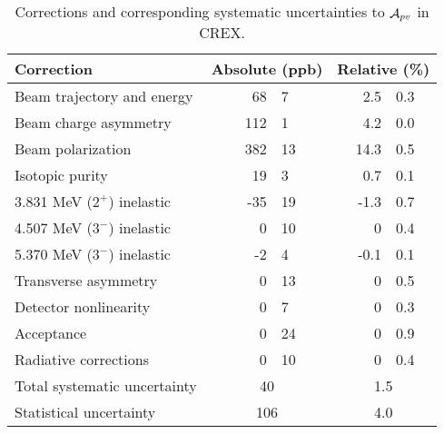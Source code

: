 \begin{table}
    \centering
    \begin{tabular}{l r@{ $\pm$ }l r@{ $\pm$ }l}
	\hline
	Correction & \multicolumn{2}{c}{Absolute (ppb)}	& \multicolumn{2}{c}{Relative (\%)}   \\
	\hline
	Beam trajectory and energy  & 68  & 7     & 2.5	    & 0.3   \\         
	Beam charge asymmetry       & 112 & 1     & 4.2     & 0.0   \\         
	\hline
	Beam polarization	    & 382 & 13    & 14.3    & 0.5   \\         
	Isotopic purity             & 19  & 3     & 0.7     & 0.1   \\         
	3.831 MeV ($2^+$) inelastic & -35 & 19    & -1.3    & 0.7   \\         
	4.507 MeV ($3^-$) inelastic & 0   & 10    & 0	    & 0.4   \\ 
	5.370 MeV ($3^-$) inelastic & -2  & 4     & -0.1    & 0.1   \\         
	Transverse asymmetry        & 0   & 13    & 0	    & 0.5   \\ 
	Detector nonlinearity       & 0   & 7     & 0	    & 0.3   \\         
	Acceptance                  & 0   & 24    & 0  	    & 0.9   \\         
	Radiative corrections	    & 0   & 10    & 0  	    & 0.4   \\         
	\hline
	Total systematic uncertainty	& \multicolumn{2}{c}{40}    & \multicolumn{2}{c}{1.5}	\\
	Statistical uncertainty		& \multicolumn{2}{c}{106}   & \multicolumn{2}{c}{4.0}	\\
	\hline
    \end{tabular}
    \caption{Corrections and corresponding systematic uncertainties to $\mathcal{A}_{pv}$ in CREX.}
    \label{tab:crex_corrections}
\end{table}

